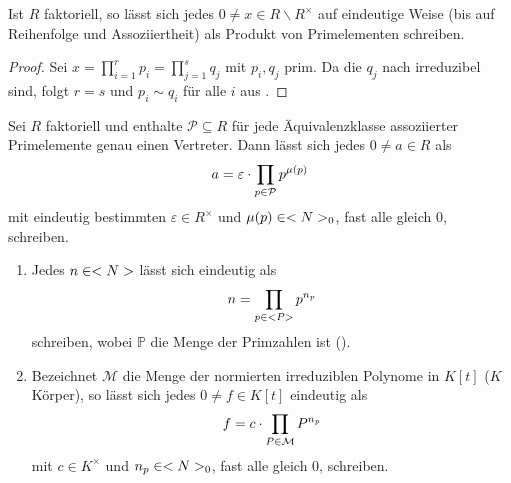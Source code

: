 \begin{proposition}
	Ist $R$ faktoriell, so lässt sich jedes $0\neq x\in R\backslash R^\times$ auf eindeutige Weise (bis auf Reihenfolge und Assoziiertheit) als Produkt von Primelementen schreiben.
\end{proposition}
\begin{proof}
	Sei $x=\prod_{i=1}^r p_i=\prod_{j=1}^s q_j$ mit $p_i,q_j$ prim. Da die $q_j$ nach  irreduzibel sind, folgt $r=s$ und $p_i\sim q_i$ für alle $i$ aus .
\end{proof}

\begin{conclusion}
	Sei $R$ faktoriell und enthalte $\mathcal{P}\subseteq R$ für jede Äquivalenzklasse assoziierter Primelemente genau einen Vertreter. Dann lässt sich jedes $0\neq a\in R$ als
	\begin{align}
		a=\varepsilon\cdot \prod_{p\in\mathcal{P}} p^{\mu(p)}\notag
	\end{align}
	mit eindeutig bestimmten $\varepsilon\in R^\times$ und $\mu(p)\in \natur_0$, fast alle gleich 0, schreiben.
\end{conclusion}

\begin{example}
	\begin{enumerate}
		\item Jedes $n\in\natur$ lässt sich eindeutig als
		\begin{align}
			n=\prod_{p\in\mathbb{P}} p^{n_p}\notag
		\end{align}
		schreiben, wobei $\mathbb{P}$ die Menge der Primzahlen ist ().
		\item Bezeichnet $\mathcal{M}$ die Menge der normierten irreduziblen Polynome in $K[t]$ ($K$ Körper), so lässt sich jedes $0\neq f\in K[t]$ eindeutig als
		\begin{align}
			f=c\cdot\prod_{P\in\mathcal{M}} P^{n_p}\notag
		\end{align}
		mit $c\in K^\times$ und $n_p\in\natur_0$, fast alle gleich 0, schreiben.
	\end{enumerate}
\end{example}